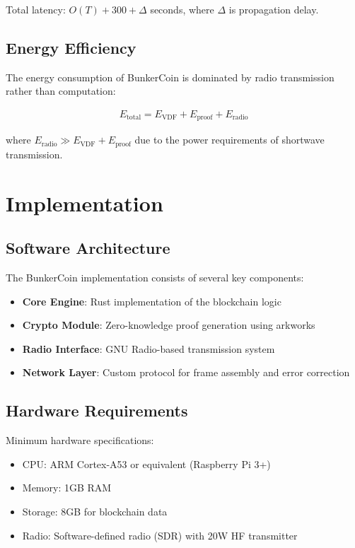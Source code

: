 \documentclass[11pt,a4paper]{article}
\begin{document}
Total latency: $O(T) + 300 + \Delta$ seconds, where $\Delta$ is propagation delay.

\subsection{Energy Efficiency}

The energy consumption of BunkerCoin is dominated by radio transmission rather than computation:

\begin{align}
E_{\text{total}} = E_{\text{VDF}} + E_{\text{proof}} + E_{\text{radio}}
\end{align}

where $E_{\text{radio}} \gg E_{\text{VDF}} + E_{\text{proof}}$ due to the power requirements of shortwave transmission.

\section{Implementation}

\subsection{Software Architecture}

The BunkerCoin implementation consists of several key components:

\begin{itemize}
\item \textbf{Core Engine}: Rust implementation of the blockchain logic
\item \textbf{Crypto Module}: Zero-knowledge proof generation using arkworks
\item \textbf{Radio Interface}: GNU Radio-based transmission system
\item \textbf{Network Layer}: Custom protocol for frame assembly and error correction
\end{itemize}

\subsection{Hardware Requirements}

Minimum hardware specifications:
\begin{itemize}
\item CPU: ARM Cortex-A53 or equivalent (Raspberry Pi 3+)
\item Memory: 1GB RAM
\item Storage: 8GB for blockchain data
\item Radio: Software-defined radio (SDR) with 20W HF transmitter
\end{itemize}
\end{document}
